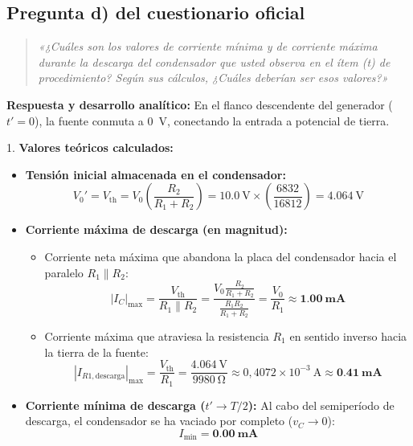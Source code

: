 \begin{appendices}
\subsection{Pregunta d) del cuestionario oficial}
\begin{quote}
    \textit{«¿Cuáles son los valores de corriente mínima y de corriente máxima durante la descarga del condensador que usted observa en el ítem (t) de procedimiento? Según sus cálculos, ¿Cuáles deberían ser esos valores?»}
\end{quote}

\textbf{Respuesta y desarrollo analítico:}
En el flanco descendente del generador ($t' = 0$), la fuente conmuta a \qty{0}{\volt}, conectando la entrada a potencial de tierra.

1. \textbf{Valores teóricos calculados:}
\begin{itemize}
    \item \textbf{Tensión inicial almacenada en el condensador:}
    \begin{equation*}
        V_0' = V_{\text{th}} = V_0 \left( \frac{R_2}{R_1 + R_2} \right) = \qty{10,0}{\volt} \times \left( \frac{6832}{16812} \right) = \qty{4,064}{\volt}
    \end{equation*}
    \item \textbf{Corriente máxima de descarga (en magnitud):}
    \begin{itemize}
        \item Corriente neta máxima que abandona la placa del condensador hacia el paralelo $R_1 \parallel R_2$:
        \begin{equation*}
            |I_C|_{\max} = \frac{V_{\text{th}}}{R_1 \parallel R_2} = \frac{V_0 \frac{R_2}{R_1 + R_2}}{\frac{R_1 R_2}{R_1 + R_2}} = \frac{V_0}{R_1} \approx \mathbf{\qty{1,00}{\milli\ampere}}
        \end{equation*}
        \item Corriente máxima que atraviesa la resistencia $R_1$ en sentido inverso hacia la tierra de la fuente:
        \begin{equation*}
            |I_{R1,\text{descarga}}|_{\max} = \frac{V_{\text{th}}}{R_1} = \frac{\qty{4,064}{\volt}}{\qty{9980}{\ohm}} \approx 0{,}4072 \times 10^{-3}\ \unit{\ampere} \approx \mathbf{\qty{0,41}{\milli\ampere}}
        \end{equation*}
    \end{itemize}
    \item \textbf{Corriente mínima de descarga ($t' \to T/2$):}
    Al cabo del semiperíodo de descarga, el condensador se ha vaciado por completo ($v_C \to 0$):
    \begin{equation*}
        I_{\min} = \mathbf{\qty{0,00}{\milli\ampere}}
    \end{equation*}
\end{itemize}


\end{appendices}
